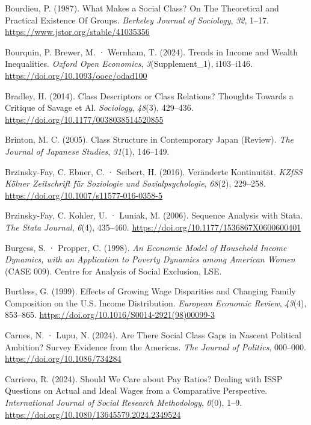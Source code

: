 \documentclass[
  letterpaper,
  DIV=11,
  numbers=noendperiod]{scrartcl}
\newlength{\cslhangindent}
\newenvironment{CSLReferences}[2] %
 {\begin{list}{}{%
  \setlength{\itemindent}{0pt}
  \setlength{\leftmargin}{0pt}
  \setlength{\parsep}{0pt}
  \ifodd #1
   \setlength{\leftmargin}{\cslhangindent}
   \setlength{\itemindent}{-1\cslhangindent}
  \fi
  \setlength{\itemsep}{#2\baselineskip}}}
 {\end{list}}
\begin{document}
\begin{CSLReferences}{1}{0}
Bourdieu, P. (1987). What {Makes} a {Social Class}? {On The Theoretical}
and {Practical Existence Of Groups}. \emph{Berkeley Journal of
Sociology}, \emph{32}, 1--17.
\url{https://www.jstor.org/stable/41035356}

Bourquin, P. Brewer, M. · Wernham, T. (2024). Trends in Income and
Wealth Inequalities. \emph{Oxford Open Economics},
\emph{3}(Supplement\_1), i103--i146.
\url{https://doi.org/10.1093/ooec/odad100}

Bradley, H. (2014). Class {Descriptors} or {Class Relations}? {Thoughts
Towards} a {Critique} of {Savage} et Al. \emph{Sociology}, \emph{48}(3),
429--436. \url{https://doi.org/10.1177/0038038514520855}

Brinton, M. C. (2005). Class {Structure} in {Contemporary Japan}
(Review). \emph{The Journal of Japanese Studies}, \emph{31}(1),
146--149.

Brzinsky-Fay, C. Ebner, C. · Seibert, H. (2016). {Veränderte
Kontinuität}. \emph{KZfSS Kölner Zeitschrift für Soziologie und
Sozialpsychologie}, \emph{68}(2), 229--258.
\url{https://doi.org/10.1007/s11577-016-0358-5}

Brzinsky-Fay, C. Kohler, U. · Luniak, M. (2006). Sequence {Analysis}
with {Stata}. \emph{The Stata Journal}, \emph{6}(4), 435--460.
\url{https://doi.org/10.1177/1536867X0600600401}

Burgess, S. · Propper, C. (1998). \emph{An {Economic Model} of
{Household Income Dynamics}, with an {Application} to {Poverty Dynamics}
among {American Women}} (CASE 009). Centre for Analysis of Social
Exclusion, LSE.

Burtless, G. (1999). Effects of Growing Wage Disparities and Changing
Family Composition on the {U}.{S}. Income Distribution. \emph{European
Economic Review}, \emph{43}(4), 853--865.
\url{https://doi.org/10.1016/S0014-2921(98)00099-3}

Carnes, N. · Lupu, N. (2024). Are {There Social Class Gaps} in {Nascent
Political Ambition}? {Survey Evidence} from the {Americas}. \emph{The
Journal of Politics}, 000--000. \url{https://doi.org/10.1086/734284}

Carriero, R. (2024). Should We Care about Pay Ratios? {Dealing} with
{ISSP} Questions on Actual and Ideal Wages from a Comparative
Perspective. \emph{International Journal of Social Research
Methodology}, \emph{0}(0), 1--9.
\url{https://doi.org/10.1080/13645579.2024.2349524}


\end{CSLReferences}
\end{document}
